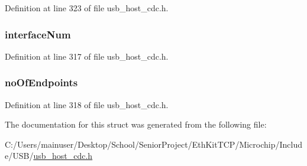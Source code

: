 Definition at line 323 of file usb\+\_\+host\+\_\+cdc.\+h.

\hypertarget{struct___d_a_t_a___i_n_t_e_r_f_a_c_e___d_e_t_a_i_l_s_a04971351adcb65ce1dd649d445c4c414}{}
\subsubsection[{interface\+Num}]{ interface\+Num}\label{struct___d_a_t_a___i_n_t_e_r_f_a_c_e___d_e_t_a_i_l_s_a04971351adcb65ce1dd649d445c4c414}


Definition at line 317 of file usb\+\_\+host\+\_\+cdc.\+h.

\hypertarget{struct___d_a_t_a___i_n_t_e_r_f_a_c_e___d_e_t_a_i_l_s_ae7efe3ea4a38a1939f37d7e220654771}{}
\subsubsection[{no\+Of\+Endpoints}]{ no\+Of\+Endpoints}\label{struct___d_a_t_a___i_n_t_e_r_f_a_c_e___d_e_t_a_i_l_s_ae7efe3ea4a38a1939f37d7e220654771}


Definition at line 318 of file usb\+\_\+host\+\_\+cdc.\+h.



The documentation for this struct was generated from the following file\+:\begin{DoxyCompactItemize}
\item 
C\+:/\+Users/mainuser/\+Desktop/\+School/\+Senior\+Project/\+Eth\+Kit\+T\+C\+P/\+Microchip/\+Include/\+U\+S\+B/\hyperlink{usb__host__cdc_8h}{usb\+\_\+host\+\_\+cdc.\+h}\end{DoxyCompactItemize}
